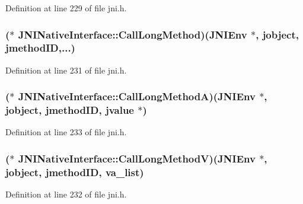 Definition at line 229 of file jni.\-h.

\hypertarget{struct_j_n_i_native_interface_abb4cbfd15dc9dd67f8ea47e614e9de45}{
\subsubsection[{Call\-Long\-Method}]{($\ast$ J\-N\-I\-Native\-Interface\-::\-Call\-Long\-Method)({\bf J\-N\-I\-Env} $\ast$, {\bf jobject}, {\bf jmethod\-I\-D},...)}}\label{struct_j_n_i_native_interface_abb4cbfd15dc9dd67f8ea47e614e9de45}


Definition at line 231 of file jni.\-h.

\hypertarget{struct_j_n_i_native_interface_a0b43cd595caef390d87c6ac075a6d460}{
\subsubsection[{Call\-Long\-Method\-A}]{($\ast$ J\-N\-I\-Native\-Interface\-::\-Call\-Long\-Method\-A)({\bf J\-N\-I\-Env} $\ast$, {\bf jobject}, {\bf jmethod\-I\-D}, {\bf jvalue} $\ast$)}}\label{struct_j_n_i_native_interface_a0b43cd595caef390d87c6ac075a6d460}


Definition at line 233 of file jni.\-h.

\hypertarget{struct_j_n_i_native_interface_ab3f4f6612178b366b331267c15c18d85}{
\subsubsection[{Call\-Long\-Method\-V}]{($\ast$ J\-N\-I\-Native\-Interface\-::\-Call\-Long\-Method\-V)({\bf J\-N\-I\-Env} $\ast$, {\bf jobject}, {\bf jmethod\-I\-D}, va\-\_\-list)}}\label{struct_j_n_i_native_interface_ab3f4f6612178b366b331267c15c18d85}


Definition at line 232 of file jni.\-h.

